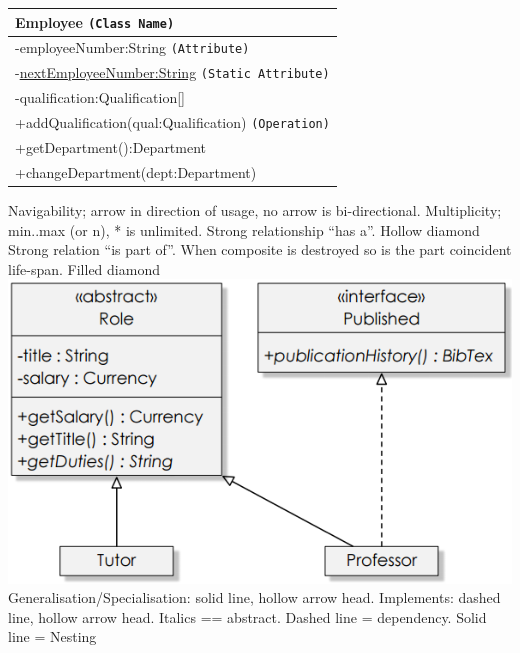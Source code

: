 \documentclass[number]{assignment}
\begin{document}
\begin{landscape}
\begin{multicols}{3}
\begin{tabular}{|l|}
\hline
Employee \texttt{(Class Name)}\\\hline
-employeeNumber:String \texttt{(Attribute)}\\
-\underline{nextEmployeeNumber:String} \texttt{(Static Attribute)}\\
-qualification:Qualification[]\\\hline
+addQualification(qual:Qualification) \texttt{(Operation)}\\
+getDepartment():Department\\
+changeDepartment(dept:Department)\\\hline
\end{tabular}
Navigability; arrow in direction of usage, no arrow is bi-directional. Multiplicity; min..max (or n), * is unlimited.
Strong relationship ``has a''. Hollow diamond
Strong relation ``is part of''. When composite is destroyed so is the part coincident life-span. Filled diamond
\includegraphics[width=\linewidth]{inheritance.png}
Generalisation/Specialisation: solid line, hollow arrow head. Implements: dashed line, hollow arrow head. Italics == abstract.
Dashed line = dependency. Solid line = Nesting


\end{multicols}
\end{landscape}
\end{document}
